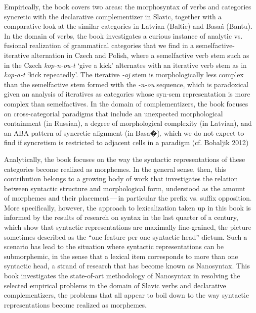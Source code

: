 Empirically, the book covers two areas: the morphosyntax of verbs and categories syncretic with the declarative complementizer in Slavic, together with a comparative look at the similar categories in Latvian (Baltic) and Basa\'a (Bantu). In the domain of verbs, the book investigates a curious instance of analytic vs. fusional realization of grammatical categories that we find in a semelfactive-iterative alternation in Czech and Polish, where a semelfactive verb stem such as in the Czech \textit{kop-n-ou-t} `give a kick' alternates with an iterative verb stem as in \textit{kop-a-t} `kick repeatedly'. The iterative \textit{-aj} stem is morphologically less complex than the semelfactive stem formed with the \textit{-n-ou} sequence, which is paradoxical given an analysis of iteratives as categories whose syn-sem representation is more complex than semelfactives. In the domain of complementizers, the book focuses on cross-categorial paradigms that include an unexpected morphological containment (in Russian), a degree of morphological complexity (in Latvian), and an ABA pattern of syncretic alignment (in Basa�), which we do not expect to find if syncretism is restricted to adjacent cells in a paradigm (cf. Bobaljik 2012)
\par
Analytically, the book focuses on the way the syntactic representations of these categories become realized as morphemes. In the general sense, then, this contribution belongs to a growing body of work that investigates the relation between syntactic structure and morphological form, understood as the amount of morphemes and their placement\,---\,in particular the prefix vs. suffix opposition. More specifically, however, the approach to lexicalization taken up in this book is informed by the results of research on syntax in the last quarter of a century, which show that syntactic representations are maximally fine-grained, the picture sometimes described as the ``one feature per one syntactic head'' dictum. Such a scenario has lead to the situation where syntactic representations can be submorphemic, in the sense that a lexical item corresponds to more than one syntactic head, a strand of research that has become known as Nanosyntax. This book investigates the state-of-art methodology of Nanosyntax in resolving the selected empirical problems in the domain of Slavic verbs and declarative complementizers, the problems that all appear to boil down to the way syntactic representations become realized as morphemes.

